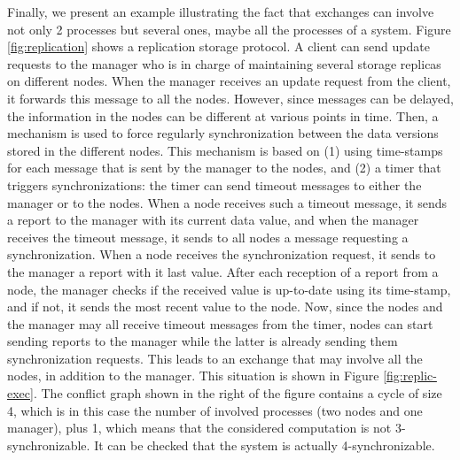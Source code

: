 Finally, we present an example illustrating the fact that exchanges can involve not only 2 processes but several ones, maybe all the processes of a system. Figure \ref{fig:replication} shows a replication storage protocol. A client can send update requests to the manager who is in charge of maintaining several storage replicas on different nodes. When the manager receives an update request from the client, it forwards this message to all the nodes. However, since messages can be delayed, the information in the nodes can be different at various points in time. Then, a mechanism is used to force regularly synchronization between the data versions stored in the different nodes. This mechanism is based on (1) using time-stamps for each message that is sent  by the manager to the nodes, and (2) a timer that triggers synchronizations: the timer can send timeout messages to either the manager or to the nodes. When a node receives such a timeout message, it sends a report to the manager with its current data value, and when the manager receives the timeout message, it sends to all nodes a message requesting a synchronization. When a node receives the synchronization request, it sends to the manager a report with it last value. After each reception of a report from a node, the manager checks if the received value is up-to-date using its time-stamp, and if not, it sends the most recent value to the node. Now, since the nodes and the manager may all receive timeout messages from the timer, nodes can start sending reports to the manager while the latter is already sending them synchronization requests. This leads to an exchange that may involve all the nodes, in addition to the manager. This situation is shown in Figure \ref{fig:replic-exec}. The conflict graph shown in the right of the figure contains a cycle of size 4, which is in this case the number of involved processes (two nodes and one manager), plus 1, which means that the considered computation is not 3-synchronizable. It can be checked that the system is actually 4-synchronizable. 



%

